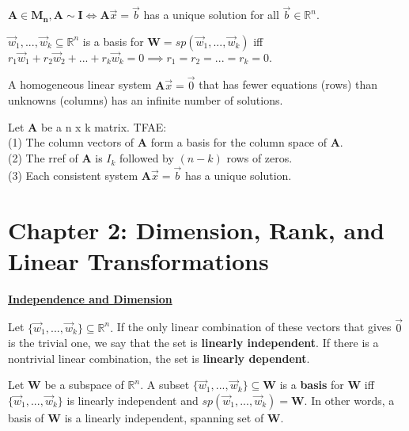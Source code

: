 \documentclass{article}
\begin{document}
\begin{theorem}
$\boldsymbol{A \in M_n}, \boldsymbol{A \sim I} \iff \boldsymbol{A}\vec{x} = \vec{b}$ has a unique solution for all $\vec{b} \in \mathbb{R}^n.$ 
\end{theorem}

\begin{theorem}
$\vec{w}_{1}, ..., \vec{w}_{k} \subseteq	\mathbb{R}^n$ is a basis for $\boldsymbol{W} = sp(\vec{w}_{1}, ..., \vec{w}_{k})$ iff $r_1\vec{w}_{1} + r_2\vec{w}_{2} + ... + r_k\vec{w}_{k} = 0 \implies r_1=r_2= ... = r_k=0.$ 
\end{theorem}

\begin{theorem}
A homogeneous linear system $\boldsymbol{A}\vec{x} = \vec{0}$ that has fewer equations (rows) than unknowns (columns) has an infinite number of solutions.
\end{theorem}

\begin{theorem}
Let $\boldsymbol{A}$ be a n x k matrix. TFAE: \\
(1) The column vectors of $\boldsymbol{A}$ form a basis for the column space of $\boldsymbol{A}.$ \\
(2) The rref of $\boldsymbol{A}$ is $I_k$ followed by $(n - k)$ rows of zeros.\\
(3) Each consistent system $\boldsymbol{A}\vec{x} = \vec{b}$ has a unique solution.
\end{theorem}

\newpage{}



\section{Chapter 2: Dimension, Rank, and Linear Transformations}
\textbf{\underline{Independence and Dimension}}
\begin{definition}
Let $\{\vec{w}_{1}, ... ,\vec{w}_{k}\} \subseteq \mathbb{R}^n.$ If the only linear combination of these vectors that gives $\vec{0}$ is the trivial one, we say that the set is \textbf{linearly independent}. If there is a nontrivial linear combination, the set is \textbf{linearly dependent}.
\end{definition}

\begin{theorem}
Let $\boldsymbol{W}$ be a subspace of $\mathbb{R}^n.$ A subset $\{\vec{w}_{1}, ..., \vec{w}_{k}\} \subseteq \boldsymbol{W}$ is a \textbf{basis} for $\boldsymbol{W}$ iff  $\{\vec{w}_{1}, ..., \vec{w}_{k}\}$ is linearly independent and $sp(\vec{w}_{1}, ..., \vec{w}_{k}) = \boldsymbol{W}.$ In other words, a basis of $\boldsymbol{W}$ is a linearly independent, spanning set of $\boldsymbol{W}.$
\end{theorem}
\end{document}
